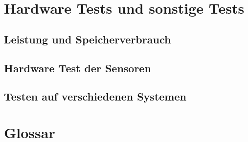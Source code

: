 \documentclass[parskip=full]{scrartcl}
\begin{document}
\clearpage
\section{Hardware Tests und sonstige Tests} \label{sonstiges}


\subsection{Leistung und Speicherverbrauch}


\subsection{Hardware Test der Sensoren}


\subsection{Testen auf verschiedenen Systemen}

\clearpage
\section{Glossar}\label{glossar}

\renewcommand*{\glossarysection}[2][]{}	%
\printnoidxglossaries				%
\end{document}
